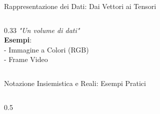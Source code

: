 \documentclass[aspectratio=169, 10pt]{beamer}
\begin{document}
\begin{frame}{Rappresentazione dei Dati: Dai Vettori ai Tensori}
\begin{columns}[T]
\begin{column}{0.33\textwidth}
            \vspace{0.2cm}
            \scriptsize
            \textit{"Un volume di dati"}\\
            \textbf{Esempi}:\\
            - Immagine a Colori (RGB)\\
            - Frame Video
        \end{column}
    \end{columns}
\end{frame}

\begin{frame}{Notazione Insiemistica e Reali: Esempi Pratici}
    \small %
    \begin{columns}[T]
        \begin{column}{0.5\textwidth}
            \vspace{0.3cm} %


\end{column}
\end{columns}
\end{frame}
\end{document}
